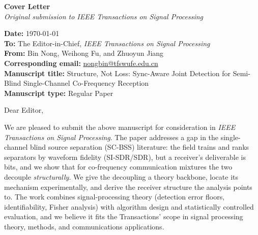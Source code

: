 \documentclass[11pt,a4paper]{article}
\begin{document}
\begin{center}
{\Large\bfseries Cover Letter}\\[4pt]
{\itshape Original submission to \emph{IEEE Transactions on Signal
Processing}}
\end{center}

\vspace{1em}

\noindent\textbf{Date:} \today\\[2pt]
\textbf{To:} The Editor-in-Chief, \emph{IEEE Transactions on Signal
Processing}\\
\textbf{From:} Bin Nong, Weihong Fu, and Zhuoyun Jiang\\
\textbf{Corresponding email:}
\href{mailto:nongbin@tfswufe.edu.cn}{nongbin@tfswufe.edu.cn}\\
\textbf{Manuscript title:} Structure, Not Loss: Sync-Aware Joint Detection
for Semi-Blind Single-Channel Co-Frequency Reception\\
\textbf{Manuscript type:} Regular Paper

\vspace{1em}

\noindent Dear Editor,

\vspace{0.4em}

We are pleased to submit the above manuscript for consideration in
\emph{IEEE Transactions on Signal Processing}. The paper addresses a gap
in the single-channel blind source separation (SC-BSS) literature: the
field trains and ranks separators by waveform fidelity (SI-SDR/SDR), but a
receiver's deliverable is bits, and we show that for co-frequency
communication mixtures the two decouple \emph{structurally}. We give the
decoupling a theory backbone, locate its mechanism experimentally, and
derive the receiver structure the analysis points to. The work combines
signal-processing theory (detection error floors, identifiability,
Fisher analysis) with algorithm design and statistically controlled
evaluation, and we believe it fits the Transactions' scope in signal
processing theory, methods, and communications applications.
\end{document}

